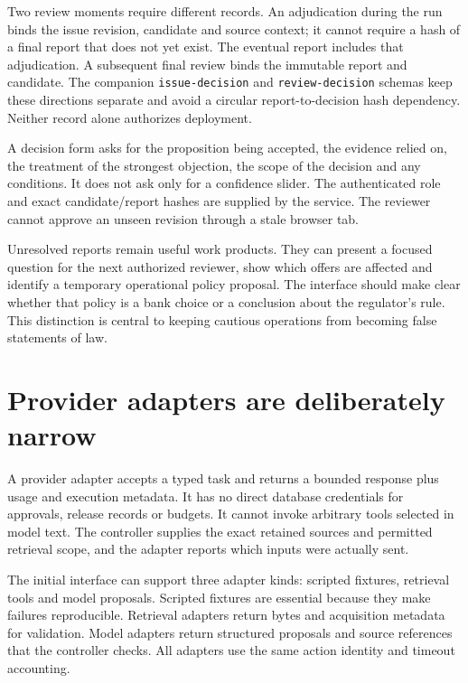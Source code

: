 Two review moments require different records. An adjudication during the run
binds the issue revision, candidate and source context; it cannot require a hash
of a final report that does not yet exist. The eventual report includes that
adjudication. A subsequent final review binds the immutable report and candidate.
The companion \texttt{issue-decision} and \texttt{review-decision} schemas keep
these directions separate and avoid a circular report-to-decision hash dependency.
Neither record alone authorizes deployment.

A decision form asks for the proposition being accepted, the evidence relied on,
the treatment of the strongest objection, the scope of the decision and any
conditions. It does not ask only for a confidence slider. The authenticated role
and exact candidate/report hashes are supplied by the service. The reviewer
cannot approve an unseen revision through a stale browser tab.

Unresolved reports remain useful work products. They can present a focused
question for the next authorized reviewer, show which offers are affected and
identify a temporary operational policy proposal. The interface should make clear
whether that policy is a bank choice or a conclusion about the regulator's rule.
This distinction is central to keeping cautious operations from becoming false
statements of law.

\section{Provider adapters are deliberately narrow}
\label{merge:M08:09}


A provider adapter accepts a typed task and returns a bounded response plus usage
and execution metadata. It has no direct database credentials for approvals,
release records or budgets. It cannot invoke arbitrary tools selected in model
text. The controller supplies the exact retained sources and permitted retrieval
scope, and the adapter reports which inputs were actually sent.

The initial interface can support three adapter kinds: scripted fixtures,
retrieval tools and model proposals. Scripted fixtures are essential because they
make failures reproducible. Retrieval adapters return bytes and acquisition
metadata for validation. Model adapters return structured proposals and source
references that the controller checks. All adapters use the same action identity
and timeout accounting.

